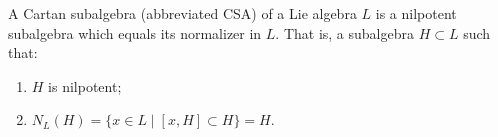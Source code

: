 A Cartan subalgebra (abbreviated CSA) of a Lie algebra $L$ is a nilpotent subalgebra which equals its normalizer in $L$. That is, a subalgebra $H \subset L$ such that:
\begin{enumerate}
\item $H$ is nilpotent;
\item $N_L(H) = \{x \in L \mid [x, H] \subset H\} = H$.
\end{enumerate}
